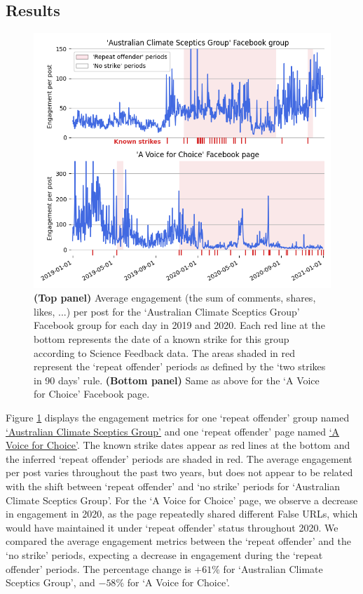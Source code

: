 \documentclass[review]{elsarticle}
\begin{document}
\subsection{Results}

\begin{figure}[!h]
\centering
\includegraphics[scale=0.5]{./../figure/sf_examples_timeseries.png}
\caption{
\textbf{(Top panel)} Average engagement (the sum of comments, shares, likes, ...) per post for the `Australian Climate Sceptics Group' Facebook group for each day in 2019 and 2020.
Each red line at the bottom represents the date of a known strike for this group according to Science Feedback data. 
The areas shaded in red represent the `repeat offender' periods as defined by the ‘two strikes in 90 days’ rule.
\textbf{(Bottom panel)} Same as above for the `A Voice for Choice' Facebook page.
}
\label{repeat_example_timeseries}
\end{figure}

Figure \ref{repeat_example_timeseries} displays the engagement metrics for one `repeat offender' group named \href{https://www.facebook.com/groups/108655705888371/}{`Australian Climate Sceptics Group'} and one `repeat offender' page named \href{https://www.facebook.com/avoiceforchoice/}{`A Voice for Choice'}.
The known strike dates appear as red lines at the bottom and the inferred ‘repeat offender’ periods are shaded in red.
The average engagement per post varies throughout the past two years, but does not appear to be related with the shift between `repeat offender' and `no strike' periods for `Australian Climate Sceptics Group'.
For the `A Voice for Choice' page, we observe a decrease in engagement in 2020, as the page repeatedly shared different False URLs, which would have maintained it under `repeat offender' status throughout 2020.
We compared the average engagement metrics between the `repeat offender' and the `no strike' periods, expecting a decrease in engagement during the `repeat offender' periods.
The percentage change is $+61\%$ for `Australian Climate Sceptics Group', and $-58\%$ for `A Voice for Choice'.
\end{document}
